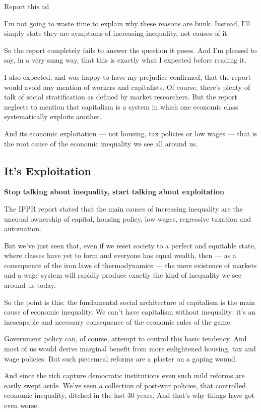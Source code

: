 \documentclass[
]{book}
\begin{document}
Report this ad

I'm not going to waste time to explain why these reasons are bunk. Instead, I'll simply state they are symptoms of increasing inequality, not causes of it.

So the report completely fails to answer the question it poses. And I'm pleased to say, in a very smug way, that this is exactly what I expected before reading it.

I also expected, and was happy to have my prejudice confirmed, that the report would avoid any mention of workers and capitalists. Of course, there's plenty of talk of social stratification as defined by market researchers. But the report neglects to mention that capitalism is a system in which one economic class systematically exploits another.

And its economic exploitation --- not housing, tax policies or low wages --- that is the root cause of the economic inequality we see all around us.

\hypertarget{its-exploitation}{%
\subsection{It's Exploitation}\label{its-exploitation}}

\textbf{Stop talking about inequality, start talking about exploitation}

The IPPR report stated that the main causes of increasing inequality are the unequal ownership of capital, housing policy, low wages, regressive taxation and automation.

But we've just seen that, even if we reset society to a perfect and equitable state, where classes have yet to form and everyone has equal wealth, then --- as a consequence of the iron laws of thermodynamics --- the mere existence of markets and a wage system will rapidly produce exactly the kind of inequality we see around us today.

So the point is this: the fundamental social architecture of capitalism is the main cause of economic inequality. We can't have capitalism without inequality: it's an inescapable and necessary consequence of the economic rules of the game.

Government policy can, of course, attempt to control this basic tendency. And most of us would derive marginal benefit from more enlightened housing, tax and wage policies. But such piecemeal reforms are a plaster on a gaping wound.

And since the rich capture democratic institutions even such mild reforms are easily swept aside. We've seen a collection of post-war policies, that controlled economic inequality, ditched in the last 30 years. And that's why things have got even worse.
\end{document}
